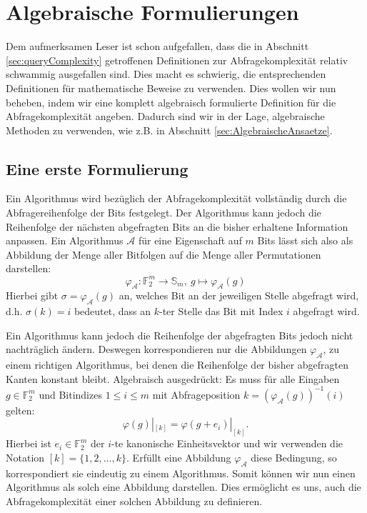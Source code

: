 \documentclass[10pt,a4paper, footheight=1mm]{scrreprt}
\theoremstyle{definition}
\begin{document}
\section{Algebraische Formulierungen}
Dem aufmerksamen Leser ist schon aufgefallen, dass die in 
Abschnitt \ref{sec:queryComplexity} getroffenen Definitionen
zur Abfragekomplexität relativ schwammig ausgefallen sind.
Dies macht es schwierig, die entsprechenden Definitionen
für mathematische Beweise zu verwenden.
Dies wollen wir nun beheben, indem wir eine komplett algebraisch
formulierte Definition für die Abfragekomplexität angeben.
Dadurch sind wir in der Lage, algebraische Methoden zu verwenden,
wie z.B. in Abschnitt \ref{sec:AlgebraischeAnsaetze}.

\subsection{Eine erste Formulierung}
\label{sec:AlgebraischeCharakterisierung}
Ein Algorithmus wird bezüglich der Abfragekomplexität vollständig
durch die Abfragereihenfolge der Bits festgelegt.
Der Algorithmus kann jedoch die Reihenfolge der nächsten
abgefragten Bits an die bisher erhaltene Information anpassen.
Ein Algorithmus $\mathcal{A}$ für eine Eigenschaft
auf $m$ Bits lässt sich also als Abbildung der Menge aller
Bitfolgen auf die Menge aller Permutationen darstellen:
$$ \varphi_\mathcal{A}: \mathbb{F}_2^m \to \mathbb{S}_m,
   ~g \mapsto \varphi_\mathcal{A}(g)$$
Hierbei gibt $\sigma = \varphi_\mathcal{A}(g)$ an, welches
Bit an der jeweiligen Stelle abgefragt wird,
d.h. $\sigma(k)=i$ bedeutet, dass an $k$-ter
Stelle das Bit mit Index $i$ abgefragt wird.

Ein Algorithmus kann jedoch die Reihenfolge der 
abgefragten Bits jedoch nicht nachträglich ändern. Deswegen
korrespondieren nur die Abbildungen $\varphi_\mathcal{A}$,
zu einem richtigen Algorithmus, bei denen die Reihenfolge
der bisher abgefragten Kanten konstant bleibt.
Algebraisch ausgedrückt: Es muss für alle Eingaben
$g\in \mathbb{F}_2^m$ und Bitindizes $1\leq i \leq m$
mit Abfrageposition $k=(\varphi_\mathcal{A}(g))^{-1}(i)$
gelten:
\begin{equation}
\label{eq:NichtNachtraeglichAendern}
\varphi(g)|_{[k]} = \varphi(g+e_i)|_{[k]}.
\end{equation}
Hierbei ist $e_i\in \mathbb{F}_2^m$
der $i$-te kanonische Einheitsvektor
und wir verwenden die Notation $[k]=\{1,2, \dots, k\}$.
Erfüllt eine Abbildung $\varphi_\mathcal{A}$ diese
Bedingung, so korrespondiert sie eindeutig
zu einem Algorithmus. Somit können wir nun
einen Algorithmus als solch eine Abbildung darstellen.
Dies ermöglicht es uns, auch die Abfragekomplexität
einer solchen Abbildung zu definieren.
\end{document}
